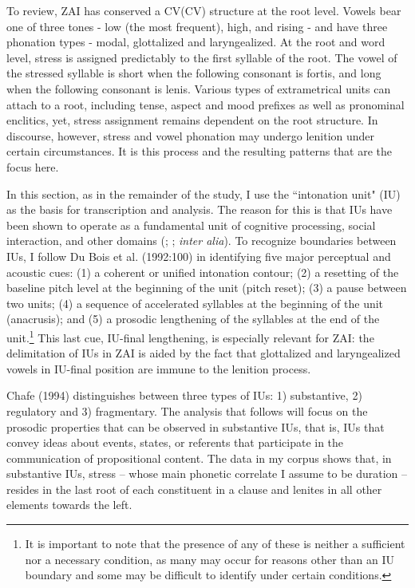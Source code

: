 To review, ZAI has conserved a CV(CV) structure at the root level. Vowels bear one of three tones - low (the most frequent), high, and rising - and have three phonation types - modal, glottalized and laryngealized. At the root and word level, stress is assigned predictably to the first syllable of the root. The vowel of the stressed syllable is short when the following consonant is fortis, and long when the following consonant is lenis. Various types of extrametrical units can attach to a root, including tense, aspect and mood prefixes as well as pronominal enclitics, yet, stress assignment remains dependent on the root structure. In discourse, however, stress and vowel phonation may undergo lenition under certain circumstances. It is this process and the resulting patterns that are the focus here.  

In this section, as in the remainder of the study, I use the ``intonation unit" (IU) \citep{chafe1994} as the basis for transcription and analysis. The reason for this is that IUs have been shown to operate as a fundamental unit of cognitive processing, social interaction, and other domains (\citealt{chafe1994}; \citealt{dubois1993}; \textit{inter alia}). To recognize boundaries between IUs, I follow Du Bois et al. (1992:100) in identifying five major perceptual and acoustic cues: (1) a coherent or unified intonation contour; (2) a resetting of the baseline pitch level at the beginning of the unit (pitch reset); (3) a pause between two units; (4) a sequence of accelerated syllables at the beginning of the unit (anacrusis); and (5) a prosodic lengthening of the syllables at the end of the unit.\footnote{It is important to note that the presence of any of these is neither a sufficient nor a necessary condition, as many may occur for reasons other than an IU boundary and some may be difficult to identify under certain conditions.} This last cue, IU-final lengthening, is especially relevant for ZAI: the delimitation of IUs in ZAI is aided by the fact that  glottalized and laryngealized vowels in IU-final position are immune to the lenition process.

Chafe (1994) distinguishes between three types of IUs: 1) substantive, 2) regulatory and 3) fragmentary. The analysis that follows will focus on the prosodic properties that can be observed in substantive IUs, that is, IUs that convey ideas about events, states, or referents that participate in the communication of propositional content. The data in my corpus shows that, in substantive IUs, stress -- whose main phonetic correlate I assume to be duration -- resides in the last root of each constituent in a clause and lenites in all other elements towards the left. 

